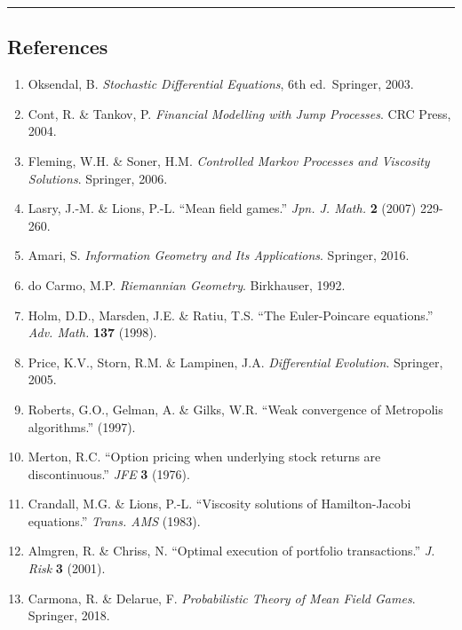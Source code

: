 \documentclass[11pt,a4paper]{article}
\begin{document}
\begin{center}\rule{0.5\linewidth}{0.5pt}\end{center}

\subsection{References}\label{references}

\begin{enumerate}
\def\labelenumi{\arabic{enumi}.}

\item
  Oksendal, B. \emph{Stochastic Differential Equations}, 6th ed.~Springer, 2003.
\item
  Cont, R. \& Tankov, P. \emph{Financial Modelling with Jump Processes}. CRC Press, 2004.
\item
  Fleming, W.H. \& Soner, H.M. \emph{Controlled Markov Processes and Viscosity Solutions}. Springer, 2006.
\item
  Lasry, J.-M. \& Lions, P.-L. ``Mean field games.'' \emph{Jpn. J. Math.} \textbf{2} (2007) 229-260.
\item
  Amari, S. \emph{Information Geometry and Its Applications}. Springer, 2016.
\item
  do Carmo, M.P. \emph{Riemannian Geometry}. Birkhauser, 1992.
\item
  Holm, D.D., Marsden, J.E. \& Ratiu, T.S. ``The Euler-Poincare equations.'' \emph{Adv. Math.} \textbf{137} (1998).
\item
  Price, K.V., Storn, R.M. \& Lampinen, J.A. \emph{Differential Evolution}. Springer, 2005.
\item
  Roberts, G.O., Gelman, A. \& Gilks, W.R. ``Weak convergence of Metropolis algorithms.'' (1997).
\item
  Merton, R.C. ``Option pricing when underlying stock returns are discontinuous.'' \emph{JFE} \textbf{3} (1976).
\item
  Crandall, M.G. \& Lions, P.-L. ``Viscosity solutions of Hamilton-Jacobi equations.'' \emph{Trans. AMS} (1983).
\item
  Almgren, R. \& Chriss, N. ``Optimal execution of portfolio transactions.'' \emph{J. Risk} \textbf{3} (2001).
\item
  Carmona, R. \& Delarue, F. \emph{Probabilistic Theory of Mean Field Games}. Springer, 2018.
\end{enumerate}
\end{document}
